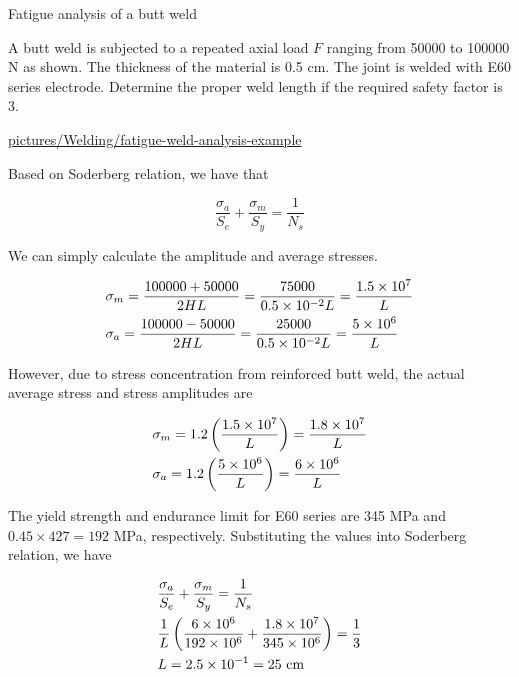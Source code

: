 \documentclass[a4paper,openany,12pt]{book}
\begin{document}
{{Fatigue analysis of a butt weld

A butt weld is subjected to a repeated axial load \(F\) ranging from 50000
to 100000 N as shown. The thickness of the material is 0.5 cm. The joint
is welded with E60 series electrode. Determine the proper weld length if
the required safety factor is 3.


\url{pictures/Welding/fatigue-weld-analysis-example}

Based on Soderberg relation, we have that

$$\frac{\sigma _a}{S_e} + \frac{\sigma _m}{S_y} = \frac{1}{N_s}$$

We can simply calculate the amplitude and average stresses.

$$\begin{gathered}
      \sigma_m = \frac{100000 + 50000}{2HL} = \frac{75000}{0.5 \times 10^{-2}L} = \frac{1.5 \times 10^7}{L} \hfill \\
      \sigma_a = \frac{100000 - 50000}{2HL} = \frac{25000}{0.5 \times 10^{-2}L} = \frac{5 \times 10^6}{L} \hfill \\ 
    \end{gathered}$$

However, due to stress concentration from reinforced butt weld, the
actual average stress and stress amplitudes are

$$\begin{gathered}
      \sigma_m = 1.2\left( \frac{1.5 \times 10^7}{L} \right) = \frac{1.8 \times 10^7}{L} \hfill \\
      \sigma_a = 1.2\left( \frac{5 \times 10^6}{L} \right) = \frac{6 \times 10^6}{L} \hfill \\ 
    \end{gathered}$$

The yield strength and endurance limit for E60 series are 345 MPa and
\(0.45 \times 427 = 192\) MPa, respectively. Substituting the values into
Soderberg relation, we have

$$\begin{gathered}
      \frac{\sigma_a}{S_e} + \frac{\sigma_m}{S_y} = \frac{1}{N_s} \hfill \\
      {1 \over L} \left( \frac{6 \times 10^6}{192 \times 10^6} + \frac{1.8 \times 10^7}{345 \times 10^6} \right) = \frac{1}{3} \hfill \\
      L = 2.5 \times {10^{-1}} = 25\text{ cm} \hfill \\ 
    \end{gathered}$$

}}
\end{document}
